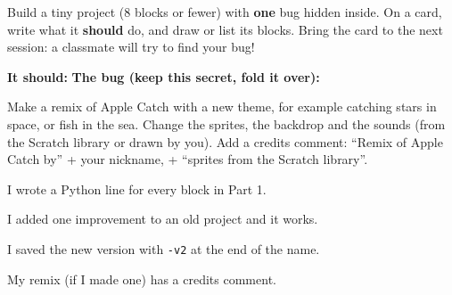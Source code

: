 \begin{challenge}
Build a tiny project (8 blocks or fewer) with \textbf{one} bug hidden inside. On a card, write what it \textbf{should} do, and draw or list its blocks. Bring the card to the next session: a classmate will try to find your bug!
\par\textbf{It should:} 
\textbf{The bug (keep this secret, fold it over):} 
\end{challenge}

\begin{creative}
Make a remix of Apple Catch with a new theme, for example catching stars in space, or fish in the sea. Change the sprites, the backdrop and the sounds (from the Scratch library or drawn by you). Add a credits comment: \enquote{Remix of Apple Catch by} + your nickname, + \enquote{sprites from the Scratch library}.
\end{creative}

\begin{selfcheck}
  \item I wrote a Python line for every block in Part 1.
  \item I added one improvement to an old project and it works.
  \item I saved the new version with \texttt{-v2} at the end of the name.
  \item My remix (if I made one) has a credits comment.
\end{selfcheck}
